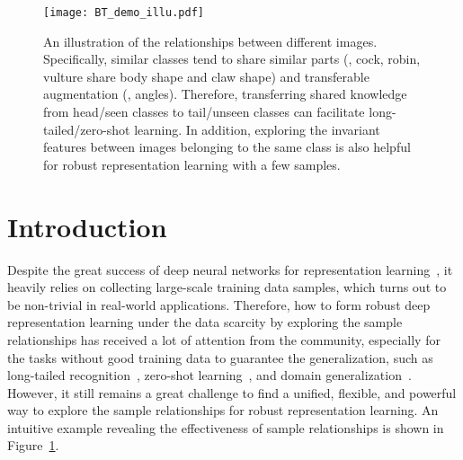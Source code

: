 \documentclass[10pt,twocolumn,letterpaper]{article}
\begin{document}
\begin{figure}[!ht]
    \centering
    \texttt{[image: BT\_demo\_illu.pdf]}
    \caption{An illustration of the relationships between different images. Specifically, similar classes tend to share similar parts (\eg, cock, robin, vulture share body shape and claw shape) and transferable augmentation (\eg, angles). Therefore, transferring shared knowledge from head/seen classes to tail/unseen classes can facilitate long-tailed/zero-shot learning. In addition, exploring the invariant features between images belonging to the same class is also helpful for robust representation learning with a few samples.}
    \label{fig:illu}
\end{figure}


\section{Introduction}

Despite the great success of deep neural networks for representation learning~\cite{He2015, he2019moco}, it heavily relies on collecting large-scale training data samples, which turns out to be non-trivial in real-world applications. Therefore, how to form robust deep representation learning under the data scarcity by exploring the sample relationships has received a lot of attention from the community, especially for the tasks without good training data to guarantee the generalization, such as long-tailed recognition~\cite{wang2020long}, zero-shot learning~\cite{naeem2021learning}, and domain generalization~\cite{cha2021swad}. However, it still remains a great challenge to find a unified, flexible, and powerful way to explore the sample relationships for robust representation learning. An intuitive example revealing the effectiveness of sample relationships is shown in Figure~\ref{fig:illu}.
\end{document}
